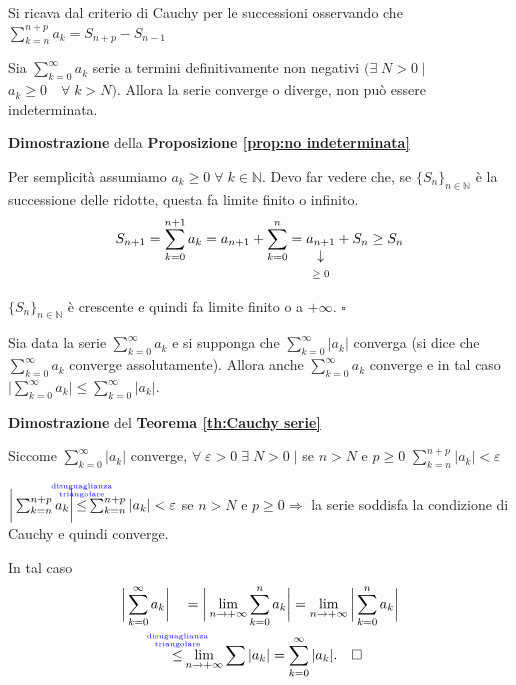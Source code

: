 {\noindent Si ricava dal criterio di Cauchy per le successioni osservando che $\sum_{k=n}^{n+p} a_k = S_{n+p} - S_{n-1}$ \par}

\begin{proposition}
	\label{prop:no indeterminata}
	Sia $\sum_{k=0}^\infty a_k$ serie a termini definitivamente non negativi $\mathrm{(} \exists \; N>0 \; | \;$ \\ %
	$a_k\geq 0 \quad \forall \; k>N \mathrm{)}$. Allora la serie converge o diverge, non può essere indeterminata. 
\end{proposition}

\begin{dembar}
	\textbf{Dimostrazione} della \textbf{Proposizione \ref{prop:no indeterminata}}
	
	Per semplicità assumiamo $a_k \geq 0 \; \forall \; k\in\mathbb{N}$. Devo far vedere che, se $\{S_n \}_{n\in\mathbb{N}}$ è la successione delle ridotte, questa fa limite finito o infinito.
	\begin{equation*}
		S_{n+1} = \sum_{k=0}^{n+1} a_k = a_{n+1} + \sum_{k=0}^n = \vertarrowbox{a_{n+1}}{$\geq 0$} + S_n \geq S_n
	\end{equation*}
	
	$\{S_n \}_{n\in\mathbb{N}}$ è crescente e quindi fa limite finito o a $+\infty$. \quad $\square$
\end{dembar}

\begin{theorem}
	\label{th:convergenza assoluta}
	Sia data la serie $\sum_{k=0}^\infty a_k$ e si supponga che $\sum_{k=0}^\infty |a_k|$ converga (si dice che $\sum_{k=0}^\infty a_k$ converge assolutamente). Allora anche $\sum_{k=0}^\infty a_k$ converge e in tal caso $\bigg| \sum_{k=0}^\infty a_k \biggr| \leq \sum_{k=0}^\infty |a_k|$.
\end{theorem}

\begin{dembar}
	\textbf{Dimostrazione} del \textbf{Teorema \ref{th:Cauchy serie}}
	
	Siccome $\sum_{k=0}^\infty |a_k|$ converge, $\forall \; \varepsilon>0 \; \exists \; N>0 \; | $ se $n>N$ e $p\geq 0$ \quad $\sum_{k=n}^{n+p} |a_k| < \varepsilon$
	
	$\bigg| \sum_{k=n}^{n+p} a_k \bigg| \distr \sum_{k=n}^{n+p} |a_k| < \varepsilon$ se $n>N$ e $p\geq0 \Rightarrow$ la serie soddisfa la condizione di Cauchy e quindi converge.
	
	In tal caso 
	\begin{align*}
		\bigg| \sum_{k=0}^\infty a_k \bigg|
		& \quad = \bigg|\lim_{n\rightarrow+\infty} \sum_{k=0}^n a_k \bigg| = \lim_{n\rightarrow+\infty} \bigg| \sum_{k=0}^n a_k \bigg| \\
		&\distr \lim_{n\rightarrow+\infty} \sum |a_k| = \sum_{k=0}^\infty |a_k|. \quad \square
	\end{align*}
\end{dembar}

